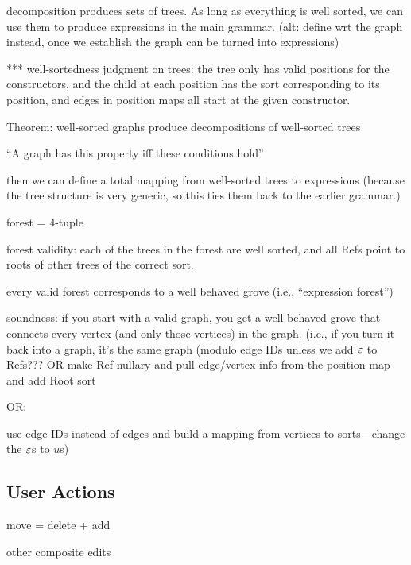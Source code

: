 
decomposition produces sets of trees. As long as everything is well sorted, we
can use them to produce expressions in the main grammar. (alt: define wrt the
graph instead, once we establish the graph can be turned into expressions)

*** well-sortedness judgment on trees: the tree only has valid positions for the
constructors, and the child at each position has the sort corresponding to its
position, and edges in position maps all start at the given constructor.

Theorem: well-sorted graphs produce decompositions of well-sorted trees

``A graph has this property iff these conditions hold''

then we can define a total mapping from well-sorted trees to expressions
(because the tree structure is very generic, so this ties them back to the
earlier grammar.)


forest = 4-tuple

forest validity: each of the trees in the forest are well sorted, and all Refs
point to roots of other trees of the correct sort.

every valid forest corresponds to a well behaved grove (i.e., ``expression
forest'')

soundness: if you start with a valid graph, you get a well behaved grove that
connects every vertex (and only those vertices) in the graph. (i.e., if you turn
it back into a graph, it's the same graph (modulo edge IDs unless we add $\varepsilon$ to
Refs??? OR make Ref nullary and pull edge/vertex info from the position map and
add Root sort

OR:

use edge IDs instead of edges and build a mapping from vertices to
sorts---change the $\varepsilon$s to $u$s)


\subsection{User Actions}%
\label{sub:User Actions}


move = delete + add

other composite edits

